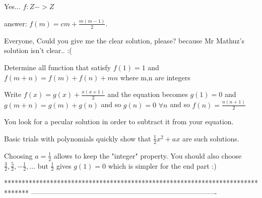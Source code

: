 \begin{solution}
	Yes... $ f : Z -> Z$
\end{solution}



\begin{solution}
	answer:  $f(m)=cm+\frac{m(m-1)}{2}$.
\end{solution}



\begin{solution}
	Everyone, Could you give me the clear solution, please? 
because Mr Mathuz's solution isn't clear.. :(
\end{solution}



\begin{solution}
	\begin{tcolorbox}Determine all function that satisfy $ f(1) = 1 $ and $ f(m+n) = f(m) + f(n) + mn $ where m,n are integers\end{tcolorbox}
Write $f(x)=g(x)+\frac{x(x+1)}2$ and the equation becomes $g(1)=0$ and $g(m+n)=g(m)+g(n)$ and so $g(n)=0$ $\forall n$ and so $\boxed{f(n)=\frac{n(n+1)}2}$
\end{solution}






\begin{solution}
	You look for a pecular solution in order to subtract it from your equation. 

Basic trials with polynomials quickly show that $\frac 12x^2+ax$ are such solutions. 

Choosing $a=\frac 12$ allows to keep the "integer" property. You should also choose $\frac 32,\frac 52, -\frac 12, ...$ but $\frac 12$ gives $g(1)=0$ which is simpler for the end part :)
\end{solution}
*******************************************************************************
-------------------------------------------------------------------------------


